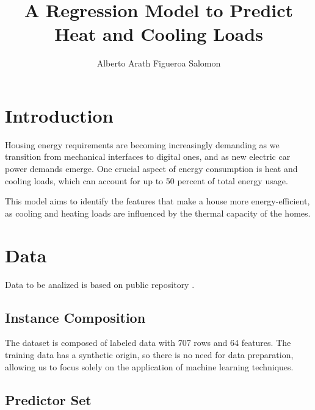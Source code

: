\documentclass{article}
\title{A Regression Model to Predict Heat and Cooling Loads}
\author{Alberto Arath Figueroa Salomon}
\begin{document}
\maketitle

\section{Introduction}

Housing energy requirements are becoming increasingly demanding as we transition from mechanical interfaces to digital ones, and as new electric car power demands emerge. One crucial aspect of energy consumption is heat and cooling loads, which can account for up to 50 percent of total energy usage.

This model aims to identify the features that make a house more energy-efficient, as cooling and heating loads are influenced by the thermal capacity of the homes.

\section{Data}

Data to be analized is based on public repository \cite{chowdhury2022energy}.
\subsection{Instance Composition}
The dataset is composed of labeled data with 707 rows and 64 features. The training data has a synthetic origin, so there is no need for data preparation, allowing us to focus solely on the application of machine learning techniques.

\subsection{Predictor Set}
\end{document}

